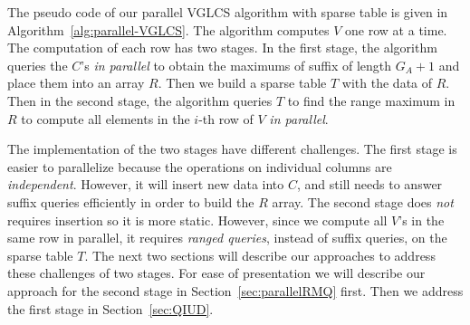 The pseudo code of our parallel VGLCS algorithm with sparse table is
given in Algorithm~\ref{alg:parallel-VGLCS}.  The algorithm computes
$V$ one row at a time.  The computation of each row has two stages.
In the first stage, the algorithm queries the $C$'s {\em in parallel}
to obtain the maximums of suffix of length $G_A+1$ and place them
into an array $R$.  Then we build a sparse table $T$ with the data of
$R$.  Then in the second stage, the algorithm queries $T$ to find the
range maximum in $R$ to compute all elements in the $i$-th row of $V$
{\em in parallel}.



The implementation of the two stages have different challenges.  The
first stage is easier to parallelize because the operations on
individual columns are {\em independent}.  However, it will insert new
data into $C$, and still needs to answer suffix queries efficiently in
order to build the $R$ array.  The second stage does {\em not}
requires insertion so it is more static.  However, since we compute
all $V$'s in the same row in parallel, it requires {\em ranged
  queries}, instead of suffix queries, on the sparse table $T$.  The
next two sections will describe our approaches to address these
challenges of two stages.  For ease of presentation we will describe
our approach for the second stage in Section~\ref{sec:parallelRMQ}
first.  Then we address the first stage in Section~\ref{sec:QIUD}.
